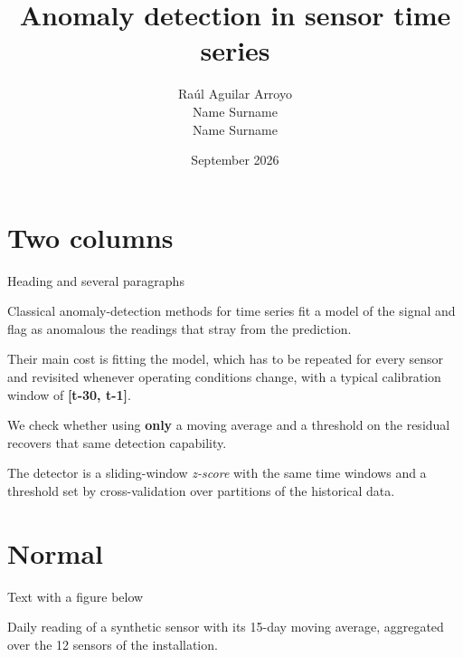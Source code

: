\documentclass[aspectratio=169,9pt]{beamer}
\title{Anomaly detection in sensor time series}
\date{September 2026}
\author{Raúl Aguilar Arroyo\\Name Surname\\Name Surname}
\begin{document}
\begin{frame}
  \titlepage
\end{frame}

\section{Two columns}

\begin{frame}{Heading and several paragraphs}
\begin{twocols}

  Classical anomaly-detection methods for time series fit a model of the
  signal and flag as anomalous the readings that stray from the
  prediction.

  Their main cost is fitting the model, which has to be repeated for every
  sensor and revisited whenever operating conditions change, with a
  typical calibration window of \textbf{[t-30, t-1]}.
\nextcol

  We check whether using \textbf{only} a moving average and a threshold on
  the residual recovers that same detection capability.

  The detector is a sliding-window \emph{z-score} with the same time
  windows and a threshold set by cross-validation over partitions of the
  historical data.
\end{twocols}
\end{frame}

\section{Normal}

\begin{frame}{Text with a figure below}

  Daily reading of a synthetic sensor with its 15-day moving average,
  aggregated over the 12 sensors of the installation.

\end{frame}
\end{document}
